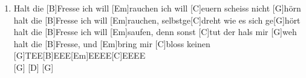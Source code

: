 \def\Titel{Halt die Fresse ich will rauchen}
\def\Interpret{Die BÄND}
\def\Referenz{Ein Lied für schlimme Zeiten}

\LiedSetup{}

\begin{guitarMagic}
    \begin{enumerate}
            \item[G]   Halt die [B]Fresse ich will [Em]rauchen ich will [C]euern scheiss nicht [G]hörn\\
            halt die [B]Fresse ich will [Em]rauchen, selbstge[C]dreht wie es sich ge[G]hört\\
            halt die [B]Fresse ich will [Em]saufen, denn sonst [C]tut der hals mir [G]weh\\
            halt die [B]Fresse, und [Em]bring mir [C]bloss keinen [G]TEE[B]EEE[Em]EEEE[C]EEEE\\
            \hspace{7pt} [G] \hspace{7pt}[D] \hspace{7pt}[G]
    \end{enumerate}
\end{guitarMagic}
